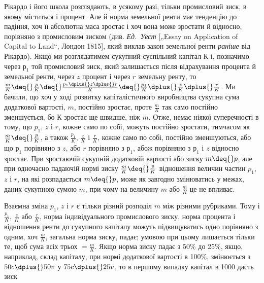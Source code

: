 Рікардо і його школа розглядають, в усякому разі, тільки промисловий
зиск, в якому міститься і процент. Але й норма земельної
ренти має тенденцію до падіння, хоч її абсолютна маса зростає
і хоч вона може зростати й відносно, порівняно з промисловим
зиском (див. \emph{Ед.~Уест} [„Essay on Application of Capital to Land“,
Лондон 1815], який виклав закон земельної ренти \emph{раніше} від
Рікардо). Якщо ми розглядатимем сукупний суспільний капітал
$К$ і, позначимо через $р_1$ той промисловий зиск, який залишається
після відрахування процента й земельної ренти, через $z$
процент і через $r$ земельну ренту, то
$\frac{m}{K} \deq{} \frac{p}{K} \deq{} \frac{p_1 \dplus{} z \dplus{} r}{K} \deq{} \frac{p_1}{K} \dplus{} \frac{z}{K} \dplus{} \frac{r}{K}$.
Ми бачили, що хоч у ході розвитку капіталістичного
виробництва сукупна сума додаткової вартості, $m$, постійно
зростає, проте $\frac{m}{K}$ так само постійно зменшується, бо $К$
зростає ще швидше, ніж $m$. Отже, немає ніякої суперечності
в тому, що $p_1$, $z$ і $r$, кожне само по собі, можуть постійно зростати,
тимчасом як $\frac{m}{K} \deq{} \frac{p}{K}$, а також $\frac{p_1}{K}$, $\frac{z}{K}$ і $\frac{r}{K}$, кожне само
по собі, постійно зменшуються, або що $р_1$ порівняно з $z$, або
$r$ порівняно з $р_1$, абож порівняно з $р_1$ і $z$ відносно зростає.
При зростаючій сукупній додатковій вартості або зиску $m \deq{} p$, але
при одночасно падаючій нормі зиску $\frac{m}{K} \deq{} \frac{p}{K}$ відношення величин
частин $p_1$, $z$ і $r$, на які розпадається $m \deq{} p$, може як завгодно
змінюватись у межах, даних сукупною сумою $m$, при чому
на величину $m$ або $\frac{m}{K}$ це не впливає.

Взаємна зміна $p_1$, $z$ і $r$ є тільки різний розподіл $m$ між різними
рубриками. Тому і $\frac{p_1}{K}$, $\frac{z}{K}$ або $\frac{r}{K}$, норма індивідуального
промислового зиску, норма процента і відношення ренти до
сукупного капіталу можуть підвищуватись одно порівняно з одним,
хоч $\frac{m}{K}$, загальна норма зиску, падає; умовою при цьому
лишається тільки те, щоб сума всіх трьох $= \frac{m}{K}$. Якщо норма
зиску падає з 50\% до 25\%, якщо, наприклад, склад капіталу,
при нормі додаткової вартості в 100\%, змінюється з $50 c \dplus{} 50 v$
у $75 c \dplus{} 25 v$, то в першому випадку капітал в 1000 дасть зиск
\parbreak{}  %
